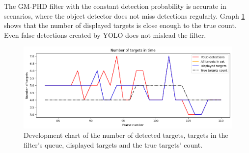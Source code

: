 The GM-PHD filter with the constant detection probability is accurate in scenarios, where the object detector does not
miss detections regularly. Graph \ref{gr:E1-V2-S0} shows that the number of displayed targets is close enough
to the true count. Even false detections created by YOLO does not mislead the filter.


\begin{figure}[H]
    \centering
    \includegraphics[width=\linewidth]{../../../experiments/E1/V2/noPd/staticPd_det}
    \caption{Development chart of the number of detected targets, targets in the filter's queue, displayed targets
    and the
    true
    targets' count.}
    \label{gr:E1-V2-S0}
\end{figure}

